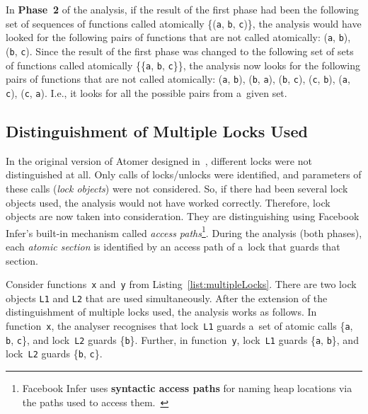 \begin{example}
    In \textbf{Phase~2} of the analysis, if the result of the first phase
    had been the following set of sequences of functions called atomically
    \{(\texttt{a}, \texttt{b}, \texttt{c})\}, the analysis would have looked
    for the following pairs of functions that are not called atomically:
    (\texttt{a}, \texttt{b}), (\texttt{b}, \texttt{c}). Since the result
    of the first phase was changed to the following set of sets of
    functions called atomically \{\{\texttt{a}, \texttt{b}, \texttt{c}\}\},
    the analysis now looks for the following pairs of functions that are
    not called atomically: (\texttt{a}, \texttt{b}), (\texttt{b},
    \texttt{a}), (\texttt{b}, \texttt{c}), (\texttt{c}, \texttt{b}),
    (\texttt{a}, \texttt{c}), (\texttt{c}, \texttt{a}). I.e., it looks
    for all the possible pairs from a~given set.
\end{example}

\subsection{Distinguishment of Multiple Locks Used}

In the original version of Atomer designed in~\cite{harmimBP}, different
locks were not distinguished at all. Only calls of locks/unlocks were
identified, and parameters of these calls (\emph{lock objects}) were not
considered. So, if there had been several lock objects used, the analysis
would not have worked correctly. Therefore, lock objects are now
taken into consideration. They are distinguishing using Facebook Infer's
built-in mechanism called \emph{access paths}\footnote{Facebook Infer uses
\textbf{syntactic access paths} for naming heap locations via the paths used
to access them.~\cite{racerD}}. During the analysis (both phases), each
\emph{atomic section} is identified by an access path of a~lock that
guards that section.

\begin{example}
    Consider functions~\texttt{x} and~\texttt{y} from
    Listing~\ref{list:multipleLocks}. There are two lock objects
    \texttt{L1} and \texttt{L2} that are used simultaneously.
    After the extension of the distinguishment of multiple locks used, the
    analysis works as follows. In function~\texttt{x}, the analyser
    recognises that lock~\texttt{L1} guards a~set of atomic calls
    \{\texttt{a}, \texttt{b}, \texttt{c}\}, and lock~\texttt{L2} guards
    \{\texttt{b}\}. Further, in function~\texttt{y}, lock~\texttt{L1} guards
    \{\texttt{a}, \texttt{b}\}, and lock~\texttt{L2} guards \{\texttt{b},
    \texttt{c}\}.
\end{example}

